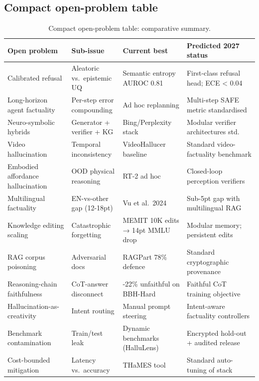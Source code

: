 \documentclass{article}
\begin{document}
\subsection{Compact open-problem table}\label{compact-open-problem-table}

\begin{table}[t]
\centering
\caption{Compact open-problem table: comparative summary.}
\label{tab:compact-open-problem-table}
\begin{tabular}{>{\raggedright\arraybackslash}p{0.2598\linewidth}
  >{\raggedright\arraybackslash}p{0.2047\linewidth}
  >{\raggedright\arraybackslash}p{0.2520\linewidth}
  >{\raggedright\arraybackslash}p{0.2835\linewidth}}
\toprule
Open problem & Sub-issue & Current best & Predicted 2027 status \\
\midrule
Calibrated refusal & Aleatoric vs.~epistemic UQ & Semantic entropy AUROC 0.81 & First-class refusal head; ECE \textless{} 0.04 \\
Long-horizon agent factuality & Per-step error compounding & Ad hoc replanning & Multi-step SAFE metric standardised \\
Neuro-symbolic hybrids & Generator + verifier + KG & Bing/Perplexity stack & Modular verifier architectures std. \\
Video hallucination & Temporal inconsistency & VideoHallucer baseline & Standard video-factuality benchmark \\
Embodied affordance hallucination & OOD physical reasoning & RT-2 ad hoc & Closed-loop perception verifiers \\
Multilingual factuality & EN-vs-other gap (12-18pt) & Vu et al.~2024 & Sub-5pt gap with multilingual RAG \\
Knowledge editing scaling & Catastrophic forgetting & MEMIT 10K edits → 14pt MMLU drop & Modular memory; persistent edits \\
RAG corpus poisoning & Adversarial docs & RAGPart 78\% defence & Standard cryptographic provenance \\
Reasoning-chain faithfulness & CoT-answer disconnect & 14-22\% unfaithful on BBH-Hard & Faithful CoT training objective \\
Hallucination-as-creativity & Intent routing & Manual prompt steering & Intent-aware factuality controllers \\
Benchmark contamination & Train/test leak & Dynamic benchmarks (HalluLens) & Encrypted hold-out + audited release \\
Cost-bounded mitigation & Latency vs.~accuracy & THaMES tool & Standard auto-tuning of stack \\
\end{tabular}
\end{table}
\end{document}
